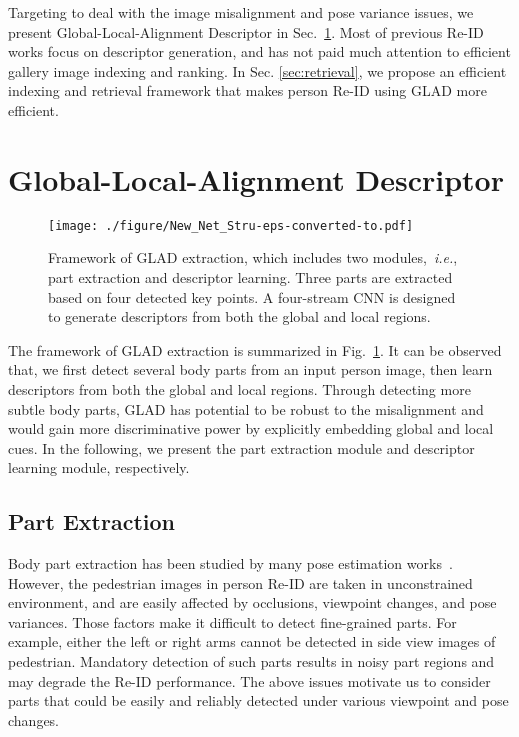\documentclass[sigconf]{acmart}
\begin{document}
Targeting to deal with the image misalignment and pose variance issues, we present Global-Local-Alignment Descriptor in Sec.~\ref{sec:GLN}. Most of previous Re-ID works focus on descriptor generation, and has not paid much attention to efficient gallery image indexing and ranking. In Sec. \ref{sec:retrieval}, we propose an efficient indexing and retrieval framework that makes person Re-ID using GLAD more efficient.

\section{Global-Local-Alignment Descriptor} \label{sec:GLN}

\begin{figure}
\begin{center}
\texttt{[image: ./figure/New\_Net\_Stru-eps-converted-to.pdf]}
\end{center}
\caption{Framework of GLAD extraction, which includes two modules,~\emph{i.e.}, part extraction and descriptor learning. Three parts are extracted based on four detected key points. A four-stream CNN is designed to generate descriptors from both the global and local regions.}
\label{fig:structure}
\end{figure}

The framework of GLAD extraction is summarized in Fig.~\ref{fig:structure}. It can be observed that, we first detect several body parts from an input person image, then learn descriptors from both the global and local regions. Through detecting more subtle body parts, GLAD has potential to be robust to the misalignment and would gain more discriminative power by explicitly embedding global and local cues. In the following, we present the part extraction module and descriptor learning module, respectively.


\subsection{Part Extraction}

Body part extraction has been studied by many pose estimation works~\cite{pose1, pose2, pose3, DeepCut, DeeperCut}. However, the pedestrian images in person Re-ID are taken in unconstrained environment, and are easily affected by occlusions, viewpoint changes, and pose variances. Those factors make it difficult to detect fine-grained parts. For example, either the left or right arms cannot be detected in side view images of pedestrian. Mandatory detection of such parts results in noisy part regions and may degrade the Re-ID performance. The above issues motivate us to consider parts that could be easily and reliably detected under various viewpoint and pose changes.
\end{document}
